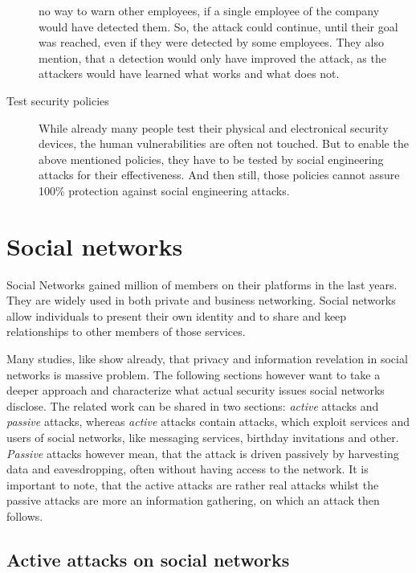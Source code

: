 \begin{description}
  no way to warn other employees, if a single employee of the company would
  have detected them. So, the attack could continue, until their goal was
  reached, even if they were detected by some employees. They also mention,
  that a detection would only have improved the attack, as the attackers would
  have learned what works and what does not.
  \item[Test security policies] While already many people test their physical
  and electronical security devices, the human vulnerabilities are often not
  touched. But to enable the above mentioned policies, they have to be tested
  by social engineering attacks for their effectiveness. And then still, those
  policies cannot assure 100\% protection against social engineering attacks.
\end{description}

\section{Social networks}

Social Networks gained million of members on their platforms in the last years.
They are widely used in both private and business networking. Social networks
allow individuals to present their own identity and to share and keep
relationships to other members of those services.

Many studies, like \cite{fraunhofer2008,gross2005} show already, that privacy
and information revelation in social networks is massive problem. The following
sections however want to take a deeper approach and characterize what actual
security issues social networks disclose. The related work can be shared in two
sections: \textit{active} attacks and \textit{passive} attacks, whereas
\textit{active} attacks contain attacks, which exploit
services and users of social networks, like messaging services, birthday
invitations and other. \textit{Passive} attacks however mean, that the attack is
driven passively by harvesting data and eavesdropping, often without having
access to the network.
It is important to note, that the active
attacks are rather real attacks whilst the passive attacks are more an
information gathering, on which an attack then follows.

\subsection{Active attacks on social networks}

